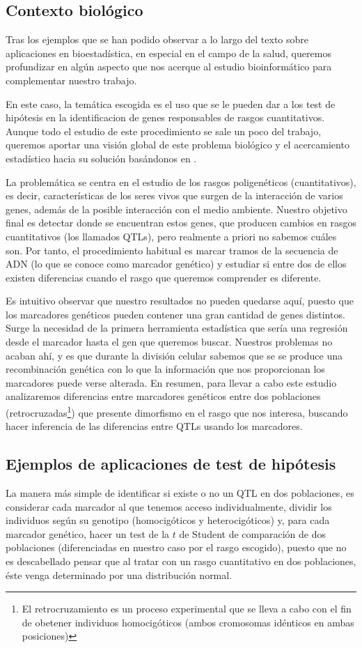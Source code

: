 \documentclass[a4paper,12pt]{article}
\begin{document}
\subsection{Contexto biológico}
Tras los ejemplos que se han podido observar a lo largo del texto sobre aplicaciones en bioestadística, en especial en el campo de la salud, queremos profundizar en algún aspecto que nos acerque al estudio bioinformático para complementar nuestro trabajo.

En este caso, la temática escogida es el uso que se le pueden dar a los test de hipótesis en la identificacion de genes responsables de rasgos cuantitativos. Aunque todo el estudio de este procedimiento se sale un poco del trabajo, queremos aportar una visión global de este problema biológico y el acercamiento estadístico hacia su solución basándonos en \cite{uned2}.

La problemática se centra en el estudio de los rasgos poligenéticos (cuantitativos), es decir, características de los seres vivos que surgen de la interacción de varios genes, además de la posible interacción con el medio ambiente. 
Nuestro objetivo final es detectar donde se encuentran estos genes, que producen cambios en rasgos cuantitativos (los llamados QTLs), pero realmente a priori no sabemos cuáles son. Por tanto, el procedimiento habitual es marcar tramos de la secuencia de ADN (lo que se conoce como marcador genético) y estudiar si entre dos de ellos existen diferencias cuando el rasgo que queremos comprender es diferente. 

Es intuitivo observar que nuestro resultados no pueden quedarse aquí, puesto que los marcadores genéticos pueden contener una gran cantidad de genes distintos. Surge la necesidad de la primera herramienta estadística que sería una regresión desde el marcador hasta el gen que queremos buscar. Nuestros problemas no acaban ahí, y es que durante la división celular sabemos que se se produce una recombinación genética con lo que la información que nos proporcionan los marcadores puede verse alterada. 
En resumen, para llevar a cabo este estudio analizaremos diferencias entre marcadores genéticos entre dos poblaciones (retrocruzadas\footnote{El retrocruzamiento es un proceso experimental que se lleva a cabo con el fin de obetener individuos homocigóticos (ambos cromosomas idénticos en ambas posiciones)}) que presente dimorfismo en el rasgo que nos interesa, buscando hacer inferencia de las diferencias entre QTLs usando los marcadores.

\subsection{Ejemplos de aplicaciones de test de hipótesis}
La manera más simple de identificar si existe o no un QTL en dos poblaciones, es considerar cada marcador al que tenemos acceso individualmente, dividir los individuos según su genotipo (homocigóticos y heterocigóticos) y, para cada marcador genético, hacer un test de la $t$ de Student de comparación de dos poblaciones (diferenciadas en nuestro caso por el rasgo escogido), puesto que no es descabellado pensar que al tratar con un rasgo cuantitativo en dos poblaciones, éste venga determinado por una distribución normal.
\end{document}
